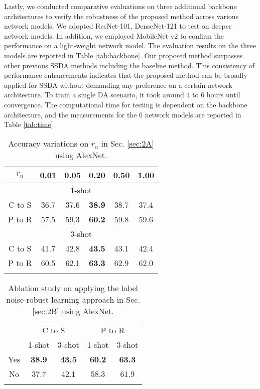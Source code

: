 \documentclass[a4paper,conference]{IEEEtran}
\begin{document}
Lastly, we conducted comparative evaluations on three additional backbone architectures to verify the robustness of the proposed method across various network models. We adopted ResNet-101\cite{resnet}, DenseNet-121\cite{densenet} to test on deeper network models. In addition, we employed MobileNet-v2 \cite{mobilenet} to confirm the performance on a light-weight network model. The evaluation results on the three models are reported in Table \ref{tab:backbone}. Our proposed method surpasses other previous SSDA methods including the baseline method. This consistency of performance enhancements indicates that the proposed method can be broadly applied for SSDA without demanding any preference on a certain network architecture. To train a single DA scenario, it took around 4 to 6 hours until convergence. The computational time for testing is dependent on the backbone architecture, and the measurements for the 6 network models are reported in Table \ref{tab:time}.



\begin{table}[!t]
\centering
\caption{Accuracy variations on $r_{u}$ in Sec. \ref{sec:2A} using AlexNet.}
\begin{tabular}{c | c c c c c}
\Xhline{4\arrayrulewidth}
$r_{u}$ & 0.01 & 0.05 & 0.20 & 0.50 & 1.00\\
\hline
\multicolumn{6}{c}{1-shot}\\
\hline
C to S & 36.7 & 37.6 & \textbf{38.9} & 38.7 & 37.4\\
P to R & 57.5 & 59.3 & \textbf{60.2} & 59.8 & 59.6\\
\hline
\multicolumn{6}{c}{3-shot}\\
\hline
C to S & 41.7 & 42.8 & \textbf{43.5} & 43.1 & 42.4\\
P to R & 60.5 & 62.1 & \textbf{63.3} & 62.9 & 62.0\\
\Xhline{4\arrayrulewidth}
\end{tabular}
\label{tab:ablation1}
\end{table}


\begin{table}[!t]
\centering
\caption{Ablation study on applying the label noise-robust learning approach in Sec. \ref{sec:2B} using AlexNet.}
\begin{tabular}{c|c c c c}
\Xhline{4\arrayrulewidth}
\multirow{2}{*}{Whether applied} & \multicolumn{2}{c}{C to S} & \multicolumn{2}{c}{P to R}\\
& 1-shot & 3-shot & 1-shot & 3-shot\\
\hline
Yes & \textbf{38.9} & \textbf{43.5} & \textbf{60.2} & \textbf{63.3}\\
No & 37.7 & 42.1 & 58.3 & 61.9\\
\Xhline{4\arrayrulewidth}
\end{tabular}
\label{tab:ablation2}
\end{table}
\end{document}
